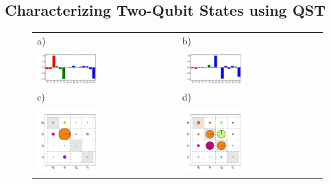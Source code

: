 \subsection{Characterizing Two-Qubit States using QST}

\begin{figure}[ht!]
	\centering
	\begin{tabular}{ll}
	a) & b) \\
	\includegraphics[width=0.48\textwidth]{"./data/ct5/2011_04_21 - grover and tomo/good_data/pauli_set_2"} & \includegraphics[width=0.48\textwidth]{"./data/ct5/2011_04_21 - grover and tomo/good_data/pauli_set_3"} \\
	c) & d) \\
	\includegraphics[width=0.48\textwidth]{"./data/ct5/2011_04_21 - grover and tomo/good_data/input_matrices_1"} & \includegraphics[width=0.48\textwidth]{"./data/ct5/2011_04_21 - grover and tomo/good_data/output_matrices_1"} \\

\end{tabular}
\end{figure}
